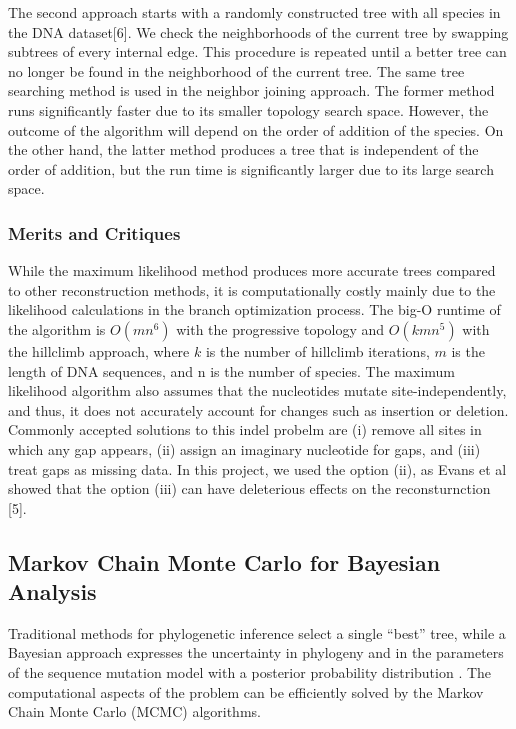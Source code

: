\documentclass[10pt,twocolumn]{article}
\begin{document}
The second approach starts with a randomly constructed tree with all species in the DNA dataset[6]. We check the neighborhoods of the current tree by swapping subtrees of every internal edge. This procedure is repeated until a better tree can no longer be found in the neighborhood of the current tree. The same tree searching method is used in the neighbor joining approach. The former method runs significantly faster due to its smaller topology search space. However, the outcome of the algorithm will depend on the order of addition of the species. On the other hand, the latter method produces a tree that is independent of the order of addition, but the run time is significantly larger due to its large search space. \\

\subsubsection*{Merits and Critiques} 

While the maximum likelihood method produces more accurate trees compared to other reconstruction methods, it is computationally costly mainly due to the likelihood calculations in the branch optimization process. The big-O runtime of the algorithm is $O(mn^6)$ with the progressive topology and $O(kmn^5)$ with the hillclimb approach, where $k$ is the number of hillclimb iterations, $m$ is the length of DNA sequences, and n is the number of species. The maximum likelihood algorithm also assumes that the nucleotides mutate site-independently, and thus, it does not accurately account for changes such as insertion or deletion. Commonly accepted solutions to this indel probelm are (i) remove all sites in which any gap appears, (ii) assign an imaginary nucleotide for gaps, and (iii) treat gaps as missing data. In this project, we used the option (ii), as Evans et al showed that the option (iii) can have deleterious effects on the reconsturnction [5].  

\subsection*{Markov Chain Monte Carlo for Bayesian Analysis}
Traditional methods for phylogenetic inference select a single ``best'' tree, while a Bayesian approach expresses the uncertainty in phylogeny and in the parameters of the sequence mutation model with a posterior probability distribution \cite{larget1999markov}. The computational aspects of the problem can be efficiently solved by the Markov Chain Monte Carlo (MCMC) algorithms.
\end{document}
